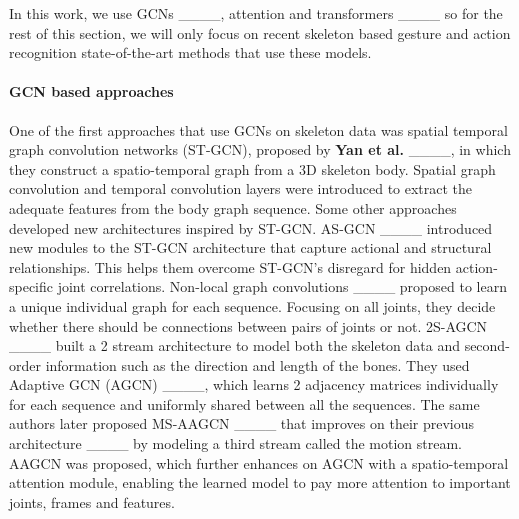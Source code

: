 In this work, we use GCNs ____, attention and transformers ____ so for the rest of this section, we will only focus on recent skeleton based gesture and action recognition state-of-the-art methods that use these models.\\
\paragraph{GCN based approaches}
One of the first approaches that use GCNs on skeleton data was spatial temporal graph convolution networks (ST-GCN), proposed by \textbf{Yan et al.} ____, in which they construct a spatio-temporal graph from a 3D skeleton body. Spatial graph convolution and temporal convolution layers were introduced to extract the adequate features from the body graph sequence. Some other approaches developed new architectures inspired by ST-GCN. 
AS-GCN ____ introduced new modules to the ST-GCN architecture that capture actional and structural relationships. This helps them overcome ST-GCN's disregard for hidden action-specific joint correlations.  
Non-local graph convolutions ____ proposed to learn a unique individual graph for each sequence. Focusing on all joints, they decide whether there should be connections between pairs of joints or not. 2S-AGCN ____ built a 2 stream architecture to model both the skeleton data and second-order information such as the direction and length of the bones. They used Adaptive GCN (AGCN) ____, which learns 2 adjacency matrices individually for each sequence and uniformly shared between all the sequences. The same authors later proposed MS-AAGCN ____ that improves on their previous architecture ____ by modeling a third stream called the motion stream. AAGCN was proposed, which further enhances on AGCN with a spatio-temporal attention module, enabling the learned model to pay more attention to important joints, frames and features. \\

